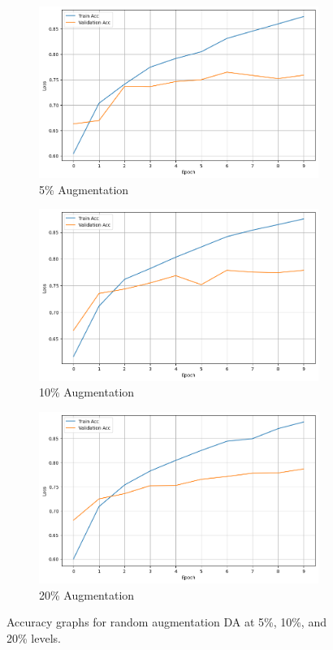 \documentclass{article}
\begin{document}
\begin{figure}[ht]
  \centering
  \begin{subfigure}[b]{0.3\textwidth}
    \includegraphics[width=\textwidth]{img/random_5.png}
    \caption{5\% Augmentation}
    \label{fig:random_5}
  \end{subfigure}
  \hfill
  \begin{subfigure}[b]{0.3\textwidth}
    \includegraphics[width=\textwidth]{img/random_10.png}
    \caption{10\% Augmentation}
    \label{fig:random_10}
  \end{subfigure}
  \hfill
  \begin{subfigure}[b]{0.3\textwidth}
    \includegraphics[width=\textwidth]{img/random_20.png}
    \caption{20\% Augmentation}
    \label{fig:random_20}
  \end{subfigure}
  \caption{Accuracy graphs for random augmentation DA at 5\%, 10\%, and 20\% levels.}
  \label{fig:random_substitution_acc}
\end{figure}
\end{document}
